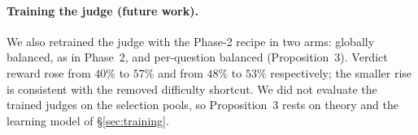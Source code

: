 \paragraph{Training the judge (future work).}
We also retrained the judge with the Phase-2 recipe in two arms: globally balanced, as in Phase~2, and per-question
balanced (Proposition~3). Verdict reward rose from $40\%$ to $57\%$ and from $48\%$ to $53\%$ respectively; the smaller
rise is consistent with the removed difficulty shortcut. We did not evaluate the trained judges on the selection pools,
so Proposition~3 rests on theory and the learning model of \S\ref{sec:training}.
